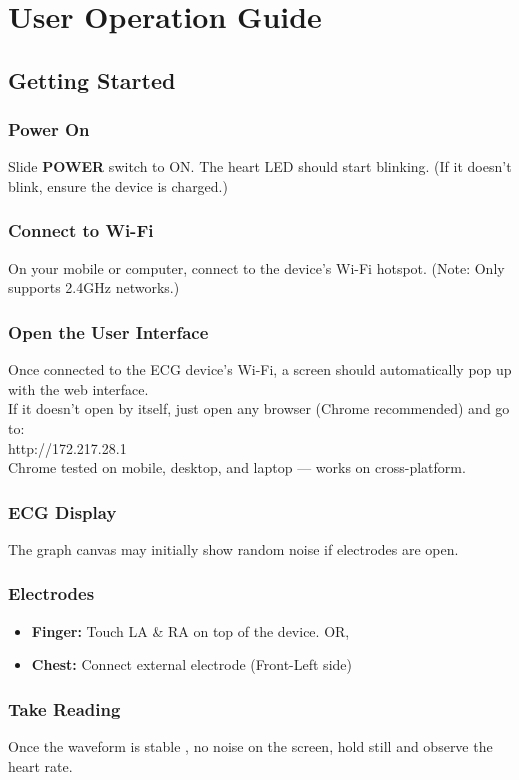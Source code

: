 \chapter{User Operation Guide}

\section{Getting Started}
\subsection{Power On}
Slide \textbf{POWER} switch to ON. The heart LED should start blinking.
(If it doesn't blink, ensure the device is charged.)
\subsection{Connect to Wi-Fi}
On your mobile or computer, connect to the device’s Wi-Fi hotspot.
(Note: Only supports 2.4GHz networks.)
\subsection{Open the User Interface}
Once connected to the ECG device's Wi-Fi, a screen should automatically pop up with the web interface. \\
If it doesn’t open by itself, just open any browser (Chrome recommended) and go to: \\
http://172.217.28.1 \\
Chrome tested on mobile, desktop, and laptop — works on cross-platform.
\subsection{ECG Display}
The graph canvas may initially show random noise if electrodes are open.

\subsection{Electrodes}
\begin{itemize}[leftmargin=*]
  \item \textbf{Finger:} Touch LA \& RA on top of the device. OR,
  \item \textbf{Chest:} Connect external electrode (Front-Left side)
\end{itemize}

\subsection{Take Reading}
Once the waveform is stable , no noise on the screen, hold still and observe the heart rate.

